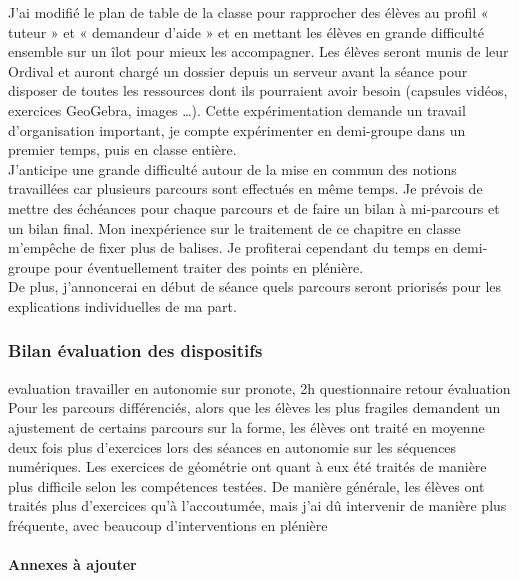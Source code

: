 J'ai modifié le plan de table de la classe pour rapprocher des élèves au profil « tuteur » et « demandeur d'aide » et en mettant les élèves en grande difficulté ensemble sur un îlot pour mieux les accompagner.
Les élèves seront munis de leur Ordival et auront chargé un dossier depuis un serveur avant la séance pour disposer de toutes les ressources dont ils pourraient avoir besoin (capsules vidéos, exercices GeoGebra, images \ldots).
Cette expérimentation demande un travail d'organisation important, je compte expérimenter en demi-groupe dans un premier temps, puis en classe entière.\\
J'anticipe une grande difficulté autour de la mise en commun des notions travaillées car plusieurs parcours sont effectués en même temps. Je prévois de mettre des échéances pour chaque parcours et de faire un bilan à mi-parcours et un bilan final. Mon inexpérience sur le traitement de ce chapitre en classe m'empêche de fixer plus de balises. Je profiterai cependant du temps en demi-groupe pour éventuellement traiter des points en plénière.\\
De plus, j'annoncerai en début de séance quels parcours seront priorisés pour les explications individuelles de ma part.

\subsubsection{Bilan évaluation des dispositifs}\label{retour_parcours}
evaluation travailler en autonomie sur pronote, 2h
questionnaire
retour évaluation
Pour les parcours différenciés, alors que les élèves les plus fragiles demandent un ajustement de certains parcours sur la forme, les élèves ont traité en moyenne deux fois plus d'exercices lors des séances en autonomie sur les séquences numériques. Les exercices de géométrie ont quant à eux été traités de manière plus difficile selon les compétences testées. De manière générale, les élèves ont traités plus d'exercices qu'à l'accoutumée, mais j'ai dû intervenir de manière plus fréquente, avec beaucoup d'interventions en plénière
\paragraph{Annexes à ajouter}
